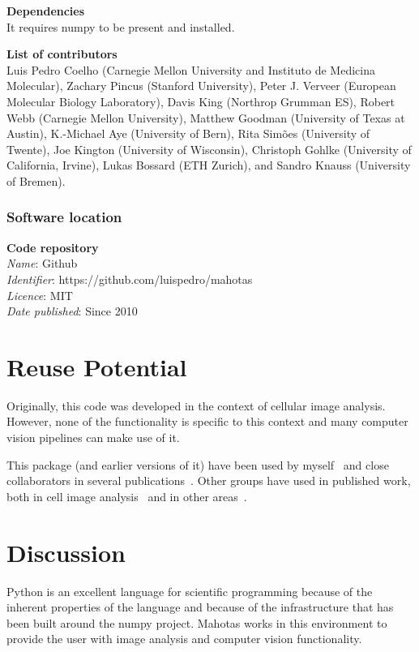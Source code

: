 \documentclass{scrartcl}
\begin{document}
\textbf{Dependencies}\\
It requires numpy to be present and installed.


\textbf{List of contributors}\\
Luis Pedro Coelho (Carnegie Mellon University and Instituto de Medicina
Molecular), Zachary Pincus (Stanford University), Peter J. Verveer (European
Molecular Biology Laboratory), Davis King (Northrop Grumman ES), Robert Webb
(Carnegie Mellon University), Matthew Goodman (University of Texas at Austin),
K.-Michael Aye (University of Bern), Rita Sim\~{o}es (University of Twente),
Joe Kington (University of Wisconsin), Christoph Gohlke (University of
California, Irvine), Lukas Bossard (ETH Zurich), and Sandro Knauss (University
of Bremen).

\subsubsection{Software location}

\textbf{Code repository}\\
\textit{Name}: Github\\
\textit{Identifier}: https://github.com/luispedro/mahotas\\
\textit{Licence}: MIT\\
\textit{Date published}: Since 2010

\section{Reuse Potential}

Originally, this code was developed in the context of cellular image analysis.
However, none of the functionality is specific to this context and many
computer vision pipelines can make use of it.

This package (and earlier versions of it) have been used by
myself~\citep{Coelho2009,Coelho2010a} and close collaborators in several
publications~\citep{omerosearcher}. Other groups have used in published work,
both in cell image analysis~\citep{CYTO:CYTO22034} and in other
areas~\citep{springerlink:10.1007/978-3-642-32335-5_2}.


\section{Discussion}

Python is an excellent language for scientific programming because of the
inherent properties of the language and because of the infrastructure that has
been built around the numpy project. Mahotas works in this environment to
provide the user with image analysis and computer vision functionality.
\end{document}
